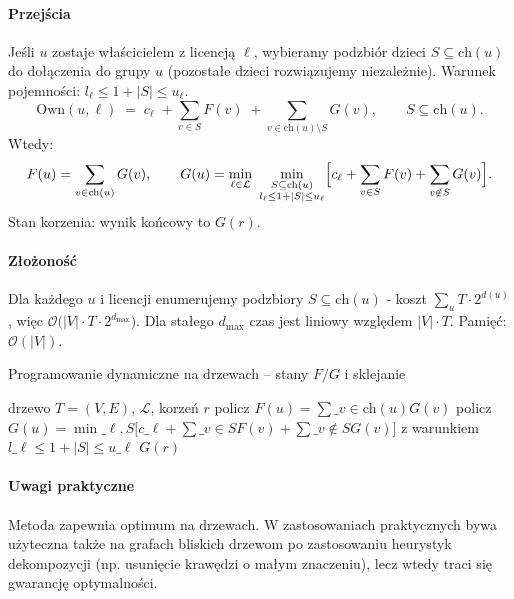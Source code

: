 \paragraph{Przejścia} Jeśli $u$ zostaje właścicielem z licencją $\ell$, wybieramy podzbiór dzieci $S\subseteq \mathrm{ch}(u)$ do dołączenia do grupy $u$ (pozostałe dzieci rozwiązujemy niezależnie). Warunek pojemności: $l_\ell \le 1+|S| \le u_\ell$.
\[
\textstyle\mathrm{Own}(u,\ell) \;=\; c_\ell\; +\! \sum\limits_{v\in S} F(v)\; +\! \sum\limits_{v\in \mathrm{ch}(u)\setminus S} G(v),\qquad S\subseteq\mathrm{ch}(u).
\]
Wtedy:
\[
F(u)= \sum\limits_{v\in\mathrm{ch}(u)} G(v),\qquad
G(u)= \min\limits_{\ell\in\mathcal{L}}\ \min\limits_{\substack{S\subseteq\mathrm{ch}(u) \\ l_\ell\le 1+|S|\le u_\ell}} \Bigl[ c_\ell + \sum\limits_{v\in S} F(v) + \sum\limits_{v\notin S} G(v) \Bigr].
\]
Stan korzenia: wynik końcowy to $G(r)$.

\paragraph{Złożoność} Dla każdego $u$ i licencji enumerujemy podzbiory $S\subseteq\mathrm{ch}(u)$ - koszt $\sum_u T\cdot 2^{d(u)}$, więc $\mathcal{O}\bigl(|V|\cdot T\cdot 2^{d_{\max}}\bigr)$. Dla stałego $d_{\max}$ czas jest liniowy względem $|V|\cdot T$. Pamięć: $\mathcal{O}(|V|)$.

\begin{algorithm}[H]
\caption{Programowanie dynamiczne na drzewach -- stany $F/G$ i sklejanie}
\label{alg:treedp}
\begin{algorithmic}[1]
\Require drzewo $T=(V,E)$, $\mathcal{L}$, korzeń $r$
  \State policz $F(u)=\sum\_{v\in \mathrm{ch}(u)} G(v)$
  \State policz $G(u)=\min\limits\_{\ell,S} \bigl[c\_\ell+\sum\_{v\in S}F(v)+\sum\_{v\notin S}G(v)\bigr]$ z warunkiem $l\_\ell\le 1+|S|\le u\_\ell$
\EndFor
\State \Return $G(r)$
\end{algorithmic}
\end{algorithm}

\paragraph{Uwagi praktyczne}
Metoda zapewnia optimum na drzewach. W zastosowaniach praktycznych bywa użyteczna także na grafach bliskich drzewom po zastosowaniu heurystyk dekompozycji (np. usunięcie krawędzi o małym znaczeniu), lecz wtedy traci się gwarancję optymalności.

